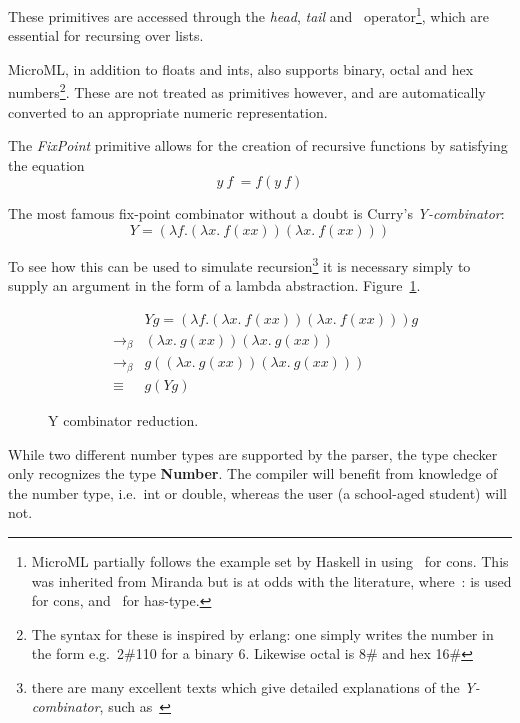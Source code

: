 \documentclass[12pt, a4paper]{report}
\begin{document}
These primitives are accessed through the \textit{head}, \textit{tail} and~\:
operator\footnote{MicroML partially follows the example set by Haskell in using~\: for cons. This
was inherited from Miranda but is at odds with the literature, where~\:: is used for cons, and~\: for
has-type.}, which are essential for recursing over lists.

MicroML, in addition to floats and ints, also supports binary, octal and hex numbers\footnote{The
syntax for these is inspired by erlang: one simply writes the number in the form e.g.\ 2\#110 for a
binary 6. Likewise octal is 8\# and hex 16\#}. These are not treated as primitives however, and are
automatically converted to an appropriate numeric representation.

The \textit{FixPoint} primitive allows for the creation of recursive functions by satisfying the equation
\begin{displaymath}
    y\ f\ = f (y\ f)
\end{displaymath}

The most famous fix-point combinator without a doubt is Curry's \textit{Y-combinator}:
\begin{displaymath}
    Y = (\lambda f. (\lambda x.\ f (x x)) (\lambda x.\ f (x x)))
\end{displaymath}

To see how this can be used to simulate recursion\footnote{there are many excellent texts which
give detailed explanations of the \textit{Y-combinator}, such as~\cite{citeulike:2570403}} it is necessary simply
to supply an argument in the form of a lambda abstraction. Figure~\ref{fig:yCombinator}.

\begin{figure}
        \begin{eqnarray*}
            && Y g = (\lambda f. (\lambda x.\ f (x x)) (\lambda x.\ f (x x))) g \\
            & \to_\beta & (\lambda x.\ g (x x)) (\lambda x.\ g (x x)) \\
            & \to_\beta & g ((\lambda x.\ g (x x)) (\lambda x.\ g (x x))) \\
            & \equiv & g (Y g)
        \end{eqnarray*}
    \caption{Y combinator reduction.}
    \label{fig:yCombinator}
\end{figure}

While two different number types are supported by the parser, the type checker only recognizes the
type \textbf{Number}. The compiler will benefit from knowledge of the number type, i.e.\ int or double,
whereas the user (a school-aged student) will not.
\end{document}
